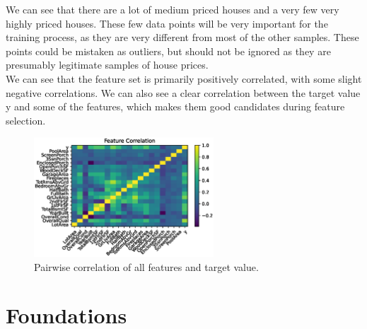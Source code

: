 \documentclass[a4paper,12pt]{article}
\newcommand{\initials}[1]{\marginpar{\quad\texttt{#1}}}
\begin{document}
We can see that there are a lot of medium priced houses and a very few very highly priced houses. These few data points will be very important for the training process, as they are very different from most of the other samples. These points could be mistaken as outliers, but should not be ignored as they are presumably legitimate samples of house prices.\\

We can see that the feature set is primarily positively correlated, with some slight negative correlations. We can also see a clear correlation between the target value y and some of the features, which makes them good candidates during feature selection.

\begin{figure}[!h]
\centering
\includegraphics[width=0.6\textwidth]{plots/full_feature_correlation}
\caption{Pairwise correlation of all features and target value.}
\end{figure}

\section{Foundations}
\initials{MF}
\end{document}
